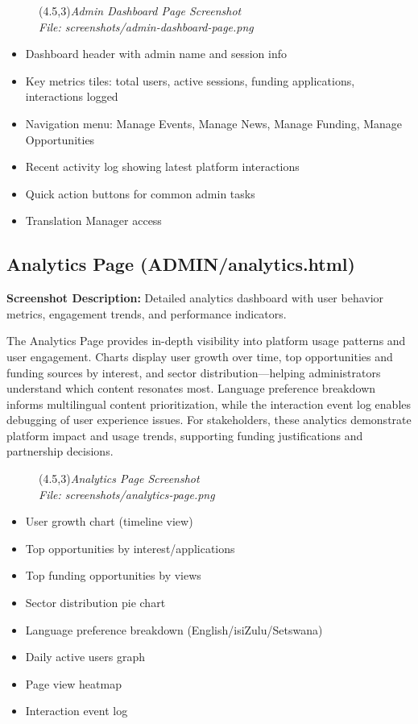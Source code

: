 \documentclass[a4paper,12pt]{article}
\begin{document}
\begin{figure}[h]
    \centering
    \framebox(4.5,3){\textit{Admin Dashboard Page Screenshot}}\\
    \small\textit{File: screenshots/admin-dashboard-page.png}
\end{figure}

\begin{itemize}
    \item Dashboard header with admin name and session info
    \item Key metrics tiles: total users, active sessions, funding applications, interactions logged
    \item Navigation menu: Manage Events, Manage News, Manage Funding, Manage Opportunities
    \item Recent activity log showing latest platform interactions
    \item Quick action buttons for common admin tasks
    \item Translation Manager access
\end{itemize}

\subsection{Analytics Page (ADMIN/analytics.html)}
\textbf{Screenshot Description:} Detailed analytics dashboard with user behavior metrics, engagement trends, and performance indicators.

The Analytics Page provides in-depth visibility into platform usage patterns and user engagement. Charts display user growth over time, top opportunities and funding sources by interest, and sector distribution—helping administrators understand which content resonates most. Language preference breakdown informs multilingual content prioritization, while the interaction event log enables debugging of user experience issues. For stakeholders, these analytics demonstrate platform impact and usage trends, supporting funding justifications and partnership decisions.

\begin{figure}[h]
    \centering
    \framebox(4.5,3){\textit{Analytics Page Screenshot}}\\
    \small\textit{File: screenshots/analytics-page.png}
\end{figure}

\begin{itemize}
    \item User growth chart (timeline view)
    \item Top opportunities by interest/applications
    \item Top funding opportunities by views
    \item Sector distribution pie chart
    \item Language preference breakdown (English/isiZulu/Setswana)
    \item Daily active users graph
    \item Page view heatmap
    \item Interaction event log
\end{itemize}
\end{document}
